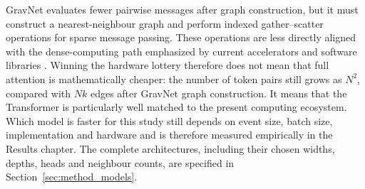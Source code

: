 GravNet evaluates fewer pairwise messages after graph construction, but it
must construct a nearest-neighbour graph and perform indexed gather--scatter
operations for sparse message passing. These operations are less directly
aligned with the dense-computing path emphasized by current accelerators and
software libraries \cite{fey2019-pytorch-geometric}. Winning the hardware
lottery therefore does not mean that full attention is mathematically cheaper:
the number of token pairs still grows as \(N^2\), compared with \(Nk\) edges
after GravNet graph construction. It means that the Transformer is
particularly well matched to the present computing ecosystem. Which model is
faster for this study still depends on event size, batch size, implementation
and hardware and is therefore measured empirically in the Results chapter.
The complete architectures, including their chosen widths, depths, heads and
neighbour counts, are specified in Section~\ref{sec:method_models}.
